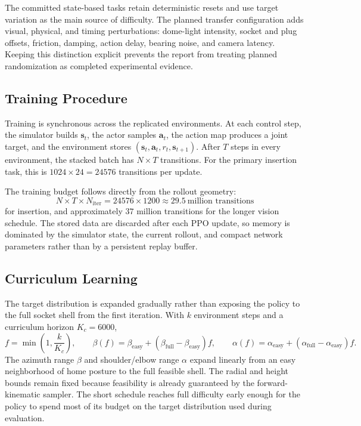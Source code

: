 The committed state-based tasks retain deterministic resets and use target variation as the main source of difficulty. The planned transfer configuration adds visual, physical, and timing perturbations: dome-light intensity, socket and plug offsets, friction, damping, action delay, bearing noise, and camera latency. Keeping this distinction explicit prevents the report from treating planned randomization as completed experimental evidence.

\rlFloatBarrier

\subsection{Training Procedure}\label{rl:sec:rl-train}

Training is synchronous across the replicated environments. At each control step, the simulator builds $\bm{s}_t$, the actor samples $\bm a_t$, the action map produces a joint target, and the environment stores $(\bm s_t,\bm a_t,r_t,\bm s_{t+1})$. After $T$ steps in every environment, the stacked batch has $N\times T$ transitions. For the primary insertion task, this is $1024\times24=\num{24576}$ transitions per update.

The training budget follows directly from the rollout geometry:
\begin{equation*}
N\times T\times N_{\mathrm{iter}}=\num{24576}\times1200\approx\num{29.5}\ \text{million transitions}
\end{equation*}
for insertion, and approximately $37$ million transitions for the longer vision schedule. The stored data are discarded after each PPO update, so memory is dominated by the simulator state, the current rollout, and compact network parameters rather than by a persistent replay buffer.

\subsection{Curriculum Learning}\label{rl:sec:rl-curr}

The target distribution is expanded gradually rather than exposing the policy to the full socket shell from the first iteration. With $k$ environment steps and a curriculum horizon $K_c=6000$,
\begin{equation}
f=\min\!\left(1,\frac{k}{K_c}\right),\qquad
\beta(f)=\beta_{\mathrm{easy}}+(\beta_{\mathrm{full}}-\beta_{\mathrm{easy}})f,
\qquad
\alpha(f)=\alpha_{\mathrm{easy}}+(\alpha_{\mathrm{full}}-\alpha_{\mathrm{easy}})f.
\label{rl:eq:rl-curr}
\end{equation}
The azimuth range $\beta$ and shoulder/elbow range $\alpha$ expand linearly from an easy neighborhood of home posture to the full feasible shell. The radial and height bounds remain fixed because feasibility is already guaranteed by the forward-kinematic sampler. The short schedule reaches full difficulty early enough for the policy to spend most of its budget on the target distribution used during evaluation.

